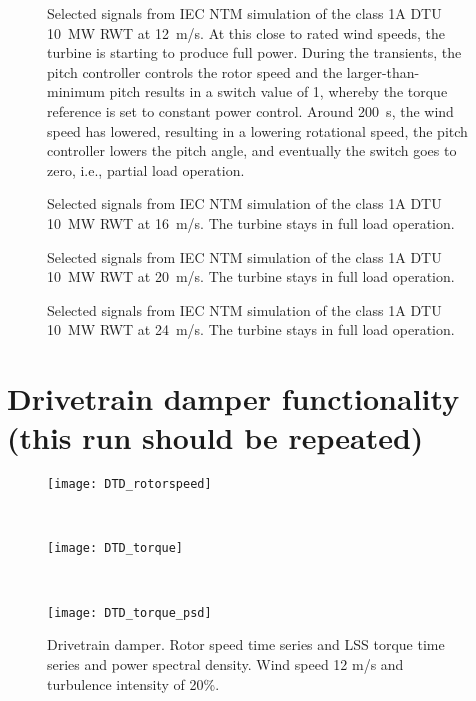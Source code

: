 \begin{figure}[t]
\centerline{ }
\caption{Selected signals from IEC NTM simulation of the class 1A DTU 10~MW RWT at 12~m/s. At this close to rated wind speeds, the turbine is starting to produce full power. During the transients, the pitch controller controls the rotor speed and the larger-than-minimum pitch results in a switch value of 1, whereby the torque reference is set to constant power control. Around 200~s, the wind speed has lowered, resulting in a lowering rotational speed, the pitch controller lowers the pitch angle, and eventually the switch goes to zero, i.e., partial load operation. \label{f:12ms}}
\end{figure}


\begin{figure}[t]
\centerline{ }
\caption{Selected signals from IEC NTM simulation of the class 1A DTU 10~MW RWT at 16~m/s. The turbine stays in full load operation. \label{f:16ms}}
\end{figure}


\begin{figure}[t]
\centerline{ }
\caption{Selected signals from IEC NTM simulation of the class 1A DTU 10~MW RWT at 20~m/s. The turbine stays in full load operation. \label{f:20ms}}
\end{figure}


\begin{figure}[t]
\centerline{ }
\caption{Selected signals from IEC NTM simulation of the class 1A DTU 10~MW RWT at 24~m/s. The turbine stays in full load operation. \label{f:24ms}}
\end{figure}

\clearpage

\section{Drivetrain damper functionality (this run should be repeated)}

\begin{figure}[b]
\begin{center}
\parbox{0.9\columnwidth}{\mbox{\texttt{[image: DTD\_rotorspeed]}}}\\
\parbox{0.9\columnwidth}{\mbox{\texttt{[image: DTD\_torque]}}}\\
\parbox{0.9\columnwidth}{\mbox{\texttt{[image: DTD\_torque\_psd]}}}
\caption{Drivetrain damper. Rotor speed time series and LSS torque time series and power spectral density. Wind speed 12 m/s and turbulence intensity of 20\%.}\label{f:DT_damper}
\end{center}
\end{figure}

